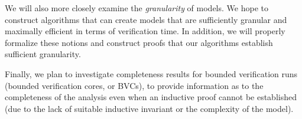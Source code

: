 We will also more closely examine the {\em granularity} of models.  We hope to construct algorithms that can create models that are sufficiently granular and maximally efficient in terms of verification time.  In addition, we will properly formalize these notions and construct proofs that our algorithms establish sufficient granularity.

Finally, we plan to investigate completeness results for bounded verification runs (bounded verification cores, or BVCs), to provide information as to the completeness of the analysis even when an inductive proof cannot be established (due to the lack of suitable inductive invariant or the complexity of the model).
\clearpage
